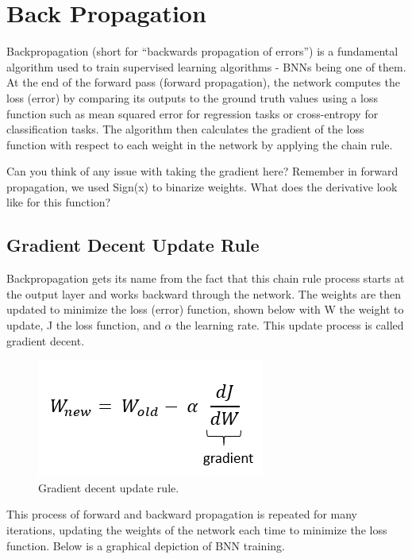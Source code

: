 \section{Back Propagation}

Backpropagation (short for ``backwards propagation of errors'') is a fundamental algorithm used to train supervised learning algorithms - BNNs being one of them. At the end of the forward pass (forward propagation), the network computes the loss (error) by comparing its outputs to the ground truth values using a loss function such as mean squared error for regression tasks or cross-entropy for classification tasks. The algorithm then calculates the gradient of the loss function with respect to each weight in the network by applying the chain rule.

\begin{exercise}
Can you think of any issue with taking the gradient here? Remember in forward propagation, we used Sign(x) to binarize weights. What does the derivative look like for this function?
\end{exercise} 

\subsection{Gradient Decent Update Rule}

Backpropagation gets its name from the fact that this chain rule process starts at the output layer and works backward through the network. The weights are then updated to minimize the loss (error) function, shown below with W the weight to update, J the loss function, and $\alpha$ the learning rate. This update process is called gradient decent.

\begin{figure}[htbp]
\centerline{\includegraphics[scale = .65]{images/grad_decent.png}}
\caption{Gradient decent update rule.}
\label{fig:grad_descent}
\end{figure}

This process of forward and backward propagation is repeated for many iterations, updating the weights of the network each time to minimize the loss function. Below is a graphical depiction of BNN training.

